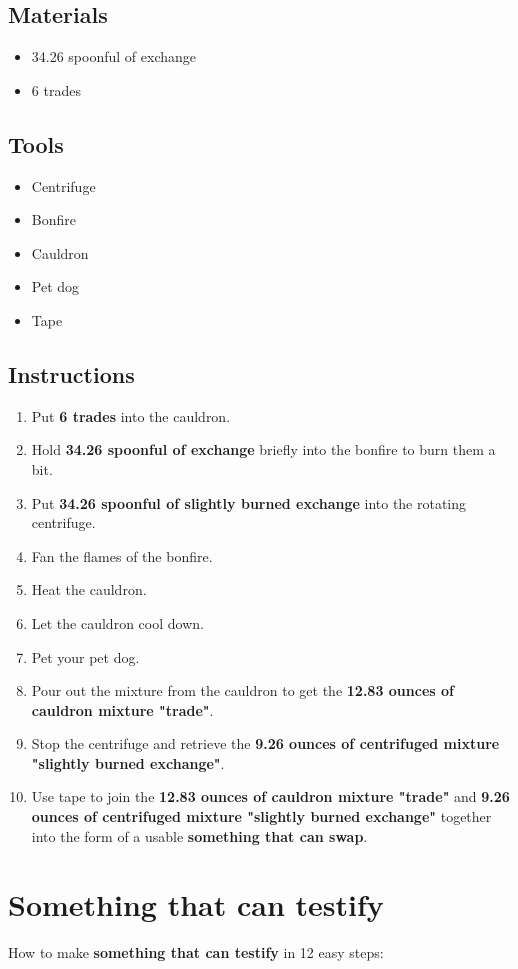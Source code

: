 \documentclass{article}
\begin{document}
\subsection{Materials}\begin{itemize}
\item 
34.26 spoonful of exchange
\item 
6 trades
\end{itemize}
\subsection{Tools}\begin{itemize}
\item 
Centrifuge
\item 
Bonfire
\item 
Cauldron
\item 
Pet dog
\item 
Tape
\end{itemize}
\subsection{Instructions}\begin{enumerate}
\item 
Put \textbf{6 trades} into the cauldron.
\item 
Hold \textbf{34.26 spoonful of exchange} briefly into the bonfire to burn them a bit.
\item 
Put \textbf{34.26 spoonful of slightly burned exchange} into the rotating centrifuge.
\item 
Fan the flames of the bonfire.
\item 
Heat the cauldron.
\item 
Let the cauldron cool down.
\item 
Pet your pet dog.
\item 
Pour out the mixture from the cauldron to get the \textbf{12.83 ounces of cauldron mixture "trade"}.
\item 
Stop the centrifuge and retrieve the \textbf{9.26 ounces of centrifuged mixture "slightly burned exchange"}.
\item 
Use tape to join the \textbf{12.83 ounces of cauldron mixture "trade"} and \textbf{9.26 ounces of centrifuged mixture "slightly burned exchange"} together into the form of a usable \textbf{something that can swap}.
\end{enumerate}
\newpage
\section{Something that can testify}How to make \textbf{something that can testify} in 12 easy steps:
\end{document}
